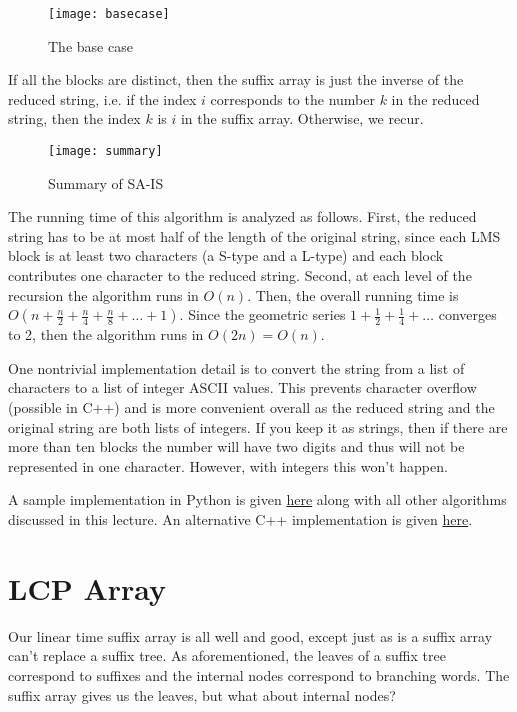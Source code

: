 \documentclass[11pt, oneside]{article}
\begin{document}
\newpage

\begin{figure}[h!]
\centering
\texttt{[image: basecase]}
\caption{The base case}
\end{figure}

If all the blocks are distinct, then the suffix array is just the inverse of
the reduced string, i.e. if the index \( i \) corresponds to the number \( k \)
in the reduced string, then the index \( k \) is \( i \) in the suffix array.
Otherwise, we recur.

\begin{figure}[h!]
\centering
\texttt{[image: summary]}
\caption{Summary of SA-IS}
\end{figure}

The running time of this algorithm is analyzed as follows.
First, the reduced string has to be at most half of the length of the original string,
since each LMS block is at least two characters (a S-type and a L-type) and each block
contributes one character to the reduced string.
Second, at each level of the recursion the algorithm runs in \( O(n) \).
Then, the overall running time is \( O(n + \frac{n}{2} + \frac{n}{4} + \frac{n}{8} + \dots + 1) \).
Since the geometric series \( 1 + \frac{1}{2} + \frac{1}{4} + \dots \) converges to 2,
then the algorithm runs in \( O(2n) = O(n) \).

One nontrivial implementation detail is to convert the string from a list of characters
to a list of integer ASCII values. This prevents character overflow (possible in C++)
and is more convenient overall as the reduced string and the original string are both lists of integers.
If you keep it as strings, then if there are more than ten blocks the number will have two digits
and thus will not be represented in one character. However, with integers this won't happen.

A sample implementation in Python is given \href{https://gist.github.com/stephen-huan/aa609965c86d750736398c28b025f9be#suffix-array}{here}
along with all other algorithms discussed in this lecture.
An alternative C++ implementation is given \href{https://gist.github.com/stephen-huan/d660e04476f06695663401d0ac01a27a#suffix-array}{here}.

\section{LCP Array}

Our linear time suffix array is all well and good, except just as is a suffix array can't replace a suffix tree.
As aforementioned, the leaves of a suffix tree correspond to suffixes and the internal nodes correspond to branching words.
The suffix array gives us the leaves, but what about internal nodes?
\end{document}

